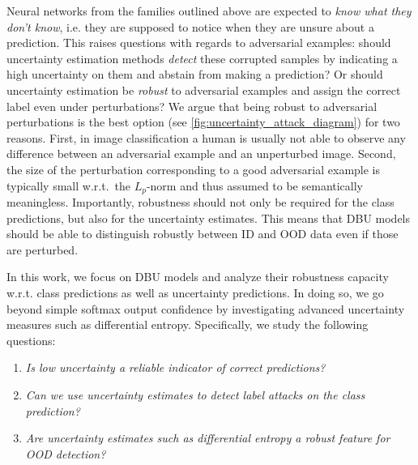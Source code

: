Neural networks from the families outlined above are expected to \emph{know what they don't know}, i.e. they are supposed to notice when they are unsure about a prediction. 
This raises questions with regards to adversarial examples: should uncertainty estimation methods \emph{detect} these corrupted samples by indicating a high uncertainty on them and abstain from making a prediction? Or should uncertainty estimation be \emph{robust} to adversarial examples and assign the correct label even under perturbations? We argue that being robust to adversarial perturbations is the best option (see \cref{fig:uncertainty_attack_diagram}) for two reasons. First, in image classification a human is usually not able to observe any difference between an adversarial example and an unperturbed image. Second, the size of the perturbation corresponding to a good adversarial example is typically small w.r.t.\ the $L_p$-norm and thus assumed to be semantically meaningless. 
Importantly, robustness should not only be required for the class predictions, but also for the uncertainty estimates. This means that DBU models should be able to distinguish robustly between ID and OOD data even if those are perturbed. 

In this work, we focus on DBU models and analyze their robustness capacity w.r.t. class predictions as well as uncertainty predictions. In doing so, we go beyond simple softmax output confidence by investigating advanced uncertainty measures such as differential entropy.
Specifically, we study the following questions: 
%
\begin{enumerate}
    \item \emph{Is low uncertainty a reliable indicator of correct predictions?}
    \item \emph{Can we use uncertainty estimates to detect label attacks on the class prediction?}
    \item \emph{Are uncertainty estimates such as differential entropy a robust feature for OOD detection?}
\end{enumerate}

